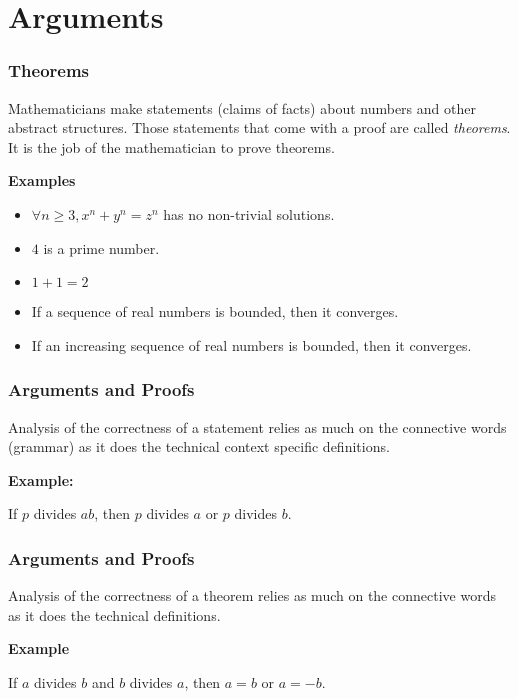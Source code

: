 \documentclass{beamer}
\begin{document}
\section{Arguments}

\begin{frame}
	\frametitle{Theorems}


	Mathematicians make statements (claims of facts) about numbers and other abstract structures. Those statements that come with a proof are called \emph{theorems}. It is the job of the mathematician to prove theorems. 

	\vspace{5mm}

	\textbf{Examples}

		\begin{itemize}
			\item[] $\forall n \geq 3, x^{n} + y^{n} = z^{n}$ has no non-trivial solutions.
			\item[] $4$ is a prime number.
			\item[] $1 + 1 = 2$
			\item[] If a sequence of real numbers is bounded, then it converges.
			\item[] If an increasing sequence of real numbers is bounded, then it converges.
		\end{itemize}

\end{frame}

\begin{frame}
  \frametitle{Arguments and Proofs}

	Analysis of the correctness of a statement relies as much on the connective words (grammar) as it does the technical context specific definitions. 

\vspace{0.5cm}

{\bf Example: }
 
If $p$ divides $ab$, then $p$ divides $a$ or $p$ divides $b$.
  
\vspace{4cm}


\end{frame}

\begin{frame}
	\frametitle{Arguments and Proofs}
  
	Analysis of the correctness of a theorem relies as much on the connective words as it does the technical definitions. 
  
  {\bf Example}
  
  If $a$ divides $b$ and $b$ divides $a$, then $a = b$ or $a = -b$. 

  \vspace{5cm}
  
  \end{frame}
\end{document}
